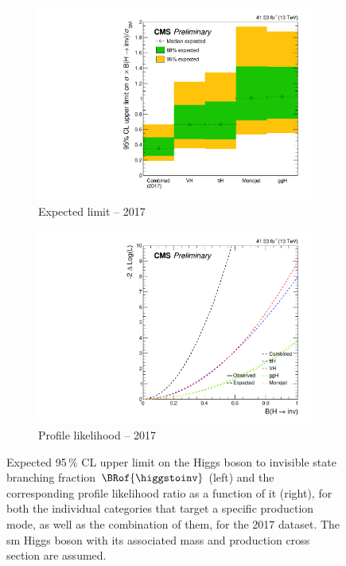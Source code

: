 \begin{figure}[htbp]
    \centering
    \begin{subfigure}[b]{0.45\textwidth}
        \includegraphics[width=\textwidth]{figures/limits/limit_2017_comb_Scenario5.pdf}
        \caption{Expected limit -- 2017}
    \end{subfigure}
    \hspace{0.05\textwidth}
    \begin{subfigure}[b]{0.45\textwidth}
        \includegraphics[width=\textwidth]{figures/likelihood_scan/profile_likelihood_scan_2017_Scenario5.pdf}
        \caption{Profile likelihood -- 2017}
    \end{subfigure}
    \caption[Expected 95\,\% CL upper limit on the Higgs boson to invisible state branching fraction $\BRof{\higgstoinv}$ and the corresponding profile likelihood ratio as a function of it, for both the individual categories that target a specific production mode, as well as the combination of them, for the 2017 dataset]{Expected 95\,\% CL upper limit on the Higgs boson to invisible state branching fraction $\BRof{\higgstoinv}$ (left) and the corresponding profile likelihood ratio as a function of it (right), for both the individual categories that target a specific production mode, as well as the combination of them, for the 2017 dataset. The \acrlong{sm} Higgs boson with its associated mass and production cross section are assumed.}
    \label{fig:htoinv_limit_likelihood_2017}
\end{figure}

